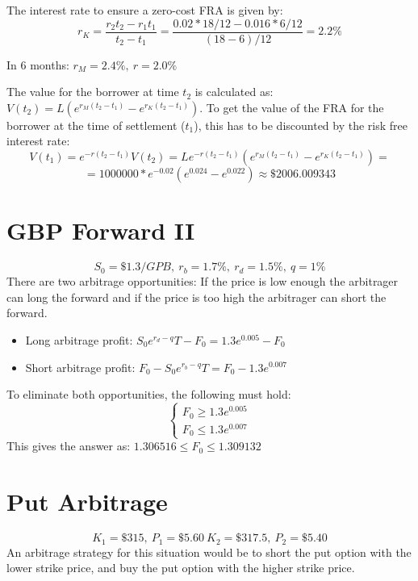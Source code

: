 \documentclass{article}
\begin{document}
The interest rate to ensure a zero-cost FRA is given by:
$$r_K = \frac{r_2t_2 - r_1t_1}{t_2-t_1} = \frac{0.02 * 18/12 - 0.016*6/12}{(18-6)/12} = 2.2\%$$

In 6 months: $r_M = 2.4\%, \ r=2.0\%$

The value for the borrower at time $t_2$ is calculated as: $ V(t_2) = L\left( e^{r_M(t_2-t_1)} - e^{r_K(t_2-t_1)} \right)$. To get the value of the FRA for the borrower at the time of settlement ($t_1$), this has to be discounted by the risk free interest rate:
$$V(t_1) = e^{-r(t_2-t_1)}V(t_2) = Le^{-r(t_2-t_1)}\left( e^{r_M(t_2-t_1)} - e^{r_K(t_2-t_1)} \right) = $$
$$ = 1000000 * e^{-0.02} \left( e^{0.024} - e^{0.022} \right) \approx \$2006.009343$$

\section{GBP Forward II}
$$S_0 = \$1.3/GPB, \ r_b = 1.7\%, \ r_d = 1.5\%, \ q=1\%$$
There are two arbitrage opportunities: If the price is low enough the arbitrager can long the forward and if the price is too high the arbitrager can short the forward.
\begin{itemize}
	\item Long arbitrage profit: $S_0e^{r_{d}-q}T - F_0= 1.3e^{0.005} - F_0$
	\item Short arbitrage profit: $F_0 - S_0e^{r_{b}-q}T = F_0 - 1.3e^{0.007}$
\end{itemize}

To eliminate both opportunities, the following must hold: 
$$\begin{cases} F_0 \geq 1.3e^{0.005} \\ F_0 \leq 1.3e^{0.007} \end{cases}$$
This gives the answer as: $1.306516 \leq F_0 \leq 1.309132$


\section{Put Arbitrage}
$$K_1 = \$315, \ P_1 = \$5.60 \ K_2 = \$317.5, \ P_2 = \$5.40$$
An arbitrage strategy for this situation would be to short the put option with the lower strike price, and buy the put option with the higher strike price. 
\end{document}
